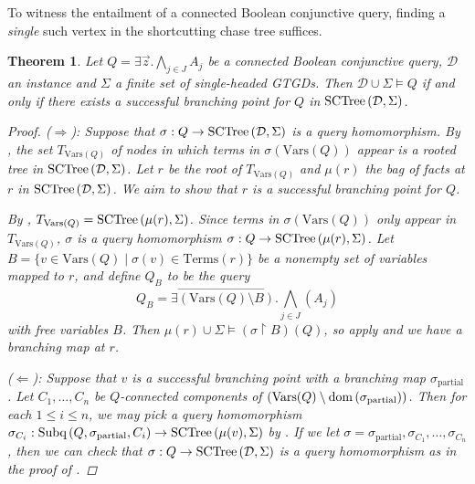 \documentclass[12pt]{report}
\theoremstyle{plain}
\newtheorem{theorem}{Theorem}[chapter]
\theoremstyle{definition}
\def\Vars{{\mathrm{Vars}}}
\def\Terms{{\mathrm{Terms}}}
\newcommand{\dom}[1]{\ensuremath{\normalfont{\operatorname{dom}} \left( #1 \right)}}
\newcommand{\SCTree}[2]{\ensuremath{\normalfont{\textrm{SCTree}} \left( #1, #2 \right)}}
\newcommand{\Subq}[3]{\ensuremath{\normalfont{\textrm{Subq}} \left( #1, #2, #3 \right)}}
\begin{document}
To witness the entailment of a connected Boolean conjunctive query, finding a \emph{single} such vertex in the shortcutting chase tree suffices.

\begin{theorem}
\label{recursive-connected-bcq-entailment}
  Let $Q = \exists \vec{z}. \bigwedge_{j \in J} A_j$ be a connected Boolean conjunctive query, $\mathcal{D}$ an instance and $\Sigma$ a finite set of single-headed GTGDs. Then $\mathcal{D} \cup \Sigma \models Q$ if and only if there exists a successful branching point for $Q$ in $\SCTree{\mathcal{D}}{\Sigma}$.
  \begin{proof}
    ($\Longrightarrow$): Suppose that $\sigma: Q \rightarrow \SCTree{\mathcal{D}}{\Sigma}$ is a query homomorphism. By , the set $T_{\Vars(Q)}$ of nodes in which terms in $\sigma(\Vars(Q))$ appear is a rooted tree in $\SCTree{\mathcal{D}}{\Sigma}$. Let $r$ be the root of $T_{\Vars(Q)}$ and $\mu(r)$ the bag of facts at $r$ in $\SCTree{\mathcal{D}}{\Sigma}$. We aim to show that $r$ is a successful branching point for $Q$.

    By , $T_{\Vars(Q)} = \SCTree{\mu(r)}{\Sigma}$. Since terms in $\sigma(\Vars(Q))$ only appear in $T_{\Vars(Q)}$, $\sigma$ is a query homomorphism $\sigma: Q \rightarrow \SCTree{\mu(r)}{\Sigma}$. Let $B = \{ v \in \Vars(Q) \mid \sigma(v) \in \Terms(r) \}$ be a nonempty set of variables mapped to $r$, and define $Q_B$ to be the query $$Q_B = \exists \overrightarrow{(\Vars(Q) \setminus B)}. \bigwedge_{j \in J}(A_j)$$ with free variables $B$. Then $\mu(r) \cup \Sigma \models (\sigma \upharpoonright B)(Q)$, so apply  and we have a branching map at $r$.

    ($\Longleftarrow$): Suppose that $v$ is a successful branching point with a branching map $\sigma_\mathrm{partial}$. Let $C_1, \ldots, C_n$ be $Q$-connected components of $(\Vars(Q) \setminus \dom{\sigma_\mathrm{partial}})$. Then for each $1 \leq i \leq n$, we may pick a query homomorphism $\sigma_{C_i}: \Subq{Q}{\sigma_\mathrm{partial}}{C_i} \rightarrow \SCTree{\mu(v)}{\Sigma}$ by . If we let $\sigma = \sigma_\mathrm{partial}, \sigma_{C_1}, \ldots, \sigma_{C_n}$, then we can check that $\sigma: Q \rightarrow \SCTree{\mathcal{D}}{\Sigma}$ is a query homomorphism as in the proof of .
  \end{proof}
\end{theorem}
\end{document}
